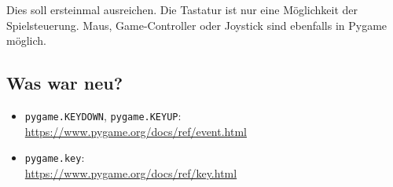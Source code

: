 Dies soll ersteinmal ausreichen. Die Tastatur ist nur eine Möglichkeit der Spielsteuerung. Maus, Game-Controller oder Joystick sind ebenfalls in Pygame möglich.

\subsection*{Was war neu?}

\begin{itemize}
	\item \texttt{pygame.KEYDOWN}, \texttt{pygame.KEYUP}:
	\\ \url{https://www.pygame.org/docs/ref/event.html}
	
	\item \texttt{pygame.key}:
	\\ \url{https://www.pygame.org/docs/ref/key.html}

\end{itemize}

